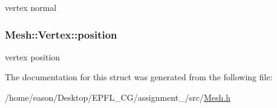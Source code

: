 vertex normal 

\subsubsection[{\texorpdfstring{position}{position}}]{ Mesh\+::\+Vertex\+::position}\hypertarget{structMesh_1_1Vertex_a6ee1c5ba29f0bf02bf446845de25548f}{}\label{structMesh_1_1Vertex_a6ee1c5ba29f0bf02bf446845de25548f}


vertex position 



The documentation for this struct was generated from the following file\+:\begin{DoxyCompactItemize}
\item 
/home/eason/\+Desktop/\+E\+P\+F\+L\+\_\+\+C\+G/assignment\+\_/src/\hyperlink{Mesh_8h}{Mesh.\+h}\end{DoxyCompactItemize}
